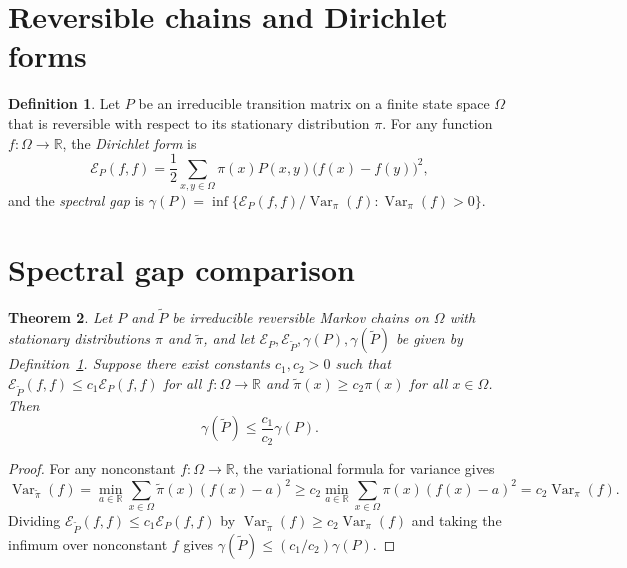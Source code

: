 \documentclass{article}
\newtheorem{theorem}{Theorem}[section]
\theoremstyle{definition}
\newtheorem{definition}[theorem]{Definition}
\begin{document}
\section{Reversible chains and Dirichlet forms}
\label{sec:markov-intro}

\begin{definition}
\label{def:dirichlet}
Let $P$ be an irreducible transition matrix on a finite state space $\Omega$
that is reversible with respect to its stationary distribution $\pi$. For any
function $f : \Omega \to \mathbb{R}$, the \emph{Dirichlet form} is
\[
\mathcal{E}_P(f,f) = \frac{1}{2} \sum_{x,y \in \Omega} \pi(x) P(x,y) \bigl(f(x) - f(y)\bigr)^2,
\]
and the \emph{spectral gap} is
$\gamma(P) = \inf \{ \mathcal{E}_P(f,f) / \operatorname{Var}_\pi(f) : \operatorname{Var}_\pi(f) > 0 \}$.
\end{definition}

\section{Spectral gap comparison}
\label{sec:gap-results}

\begin{theorem}
\label{thm:spectral-gap}
Let $P$ and $\widetilde{P}$ be irreducible reversible Markov chains on
$\Omega$ with stationary distributions $\pi$ and $\widetilde{\pi}$, and let
$\mathcal{E}_P, \mathcal{E}_{\widetilde{P}}, \gamma(P), \gamma(\widetilde{P})$
be given by Definition~\ref{def:dirichlet}. Suppose there exist constants
$c_1, c_2 > 0$ such that $\mathcal{E}_{\widetilde{P}}(f,f) \le c_1 \mathcal{E}_P(f,f)$
for all $f : \Omega \to \mathbb{R}$ and $\widetilde{\pi}(x) \ge c_2 \pi(x)$
for all $x \in \Omega$. Then
\[
\gamma(\widetilde{P}) \le \frac{c_1}{c_2} \gamma(P).
\]
\end{theorem}
\begin{proof}
For any nonconstant $f : \Omega \to \mathbb{R}$, the variational formula for
variance gives
\[
\operatorname{Var}_{\widetilde{\pi}}(f)
= \min_{a \in \mathbb{R}} \sum_{x \in \Omega} \widetilde{\pi}(x)(f(x) - a)^2
\ge c_2 \min_{a \in \mathbb{R}} \sum_{x \in \Omega} \pi(x)(f(x) - a)^2
= c_2 \operatorname{Var}_\pi(f).
\]
Dividing $\mathcal{E}_{\widetilde{P}}(f,f) \le c_1 \mathcal{E}_P(f,f)$ by
$\operatorname{Var}_{\widetilde{\pi}}(f) \ge c_2 \operatorname{Var}_\pi(f)$ and
taking the infimum over nonconstant $f$ gives $\gamma(\widetilde{P}) \le (c_1/c_2)\gamma(P)$.
\end{proof}
\end{document}
